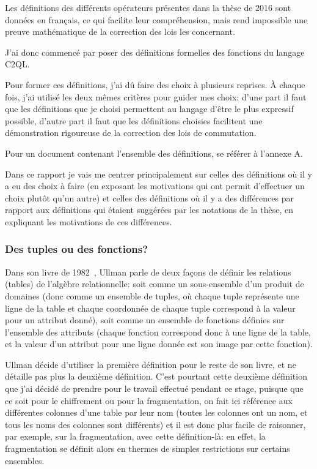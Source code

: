Les définitions des différents opérateurs présentes dans la thèse de 2016
sont données en français, ce qui facilite leur compréhension, mais rend
impossible une preuve mathématique de la correction des lois les concernant.

J'ai donc commencé par poser des définitions formelles des fonctions du langage
C2QL.

Pour former ces définitions, j'ai dû faire des choix à plusieurs reprises.
À chaque fois, j'ai utilisé les deux mêmes critères pour guider mes choix:
d'une part il faut que les définitions que je choisi permettent au langage
d'être le plus expressif possible, d'autre part il faut que les définitions
choisies facilitent une démonstration rigoureuse de la correction
des lois de commutation.

Pour un document contenant l'ensemble des définitions,
se référer à l'annexe A.

Dans ce rapport je vais me centrer principalement
sur celles des définitions où il y a eu des choix à faire
(en exposant les motivations qui ont permit d'effectuer un choix
plutôt qu'un autre) et celles des définitions où il y a des différences par rapport
aux définitions qui étaient suggérées par les notations de la thèse,
en expliquant les motivations de ces différences.

\subsubsection*{Des tuples ou des fonctions?}
Dans son livre de 1982~\cite{ullman}, Ullman parle de deux
façons de définir les relations (tables) de l'algèbre relationnelle:
soit comme un sous-ensemble d'un produit de domaines
(donc comme un ensemble de tuples, où chaque
tuple représente une ligne
de la table et chaque coordonnée de chaque tuple correspond
à la valeur pour un attribut donné), soit comme un ensemble de fonctions
définies sur l'ensemble des attributs (chaque fonction correspond donc
à une ligne de la table, et la valeur d'un attribut pour une ligne donnée
est son image par cette fonction).

Ullman décide d'utiliser la première définition pour le reste de son livre,
et ne détaille pas plus la deuxième définition. C'est pourtant cette deuxième
définition que j'ai décidé de prendre pour
le travail effectué pendant ce stage, puisque que ce soit
pour le chiffrement ou pour la fragmentation, on fait ici référence aux différentes
colonnes d'une table par leur nom (toutes les colonnes ont un nom, et tous les
noms des colonnes sont différents) et il est donc plus facile de raisonner,
par exemple, sur la fragmentation, avec cette définition-là:
en effet, la fragmentation se définit alors en thermes de simples restrictions
sur certains ensembles.

